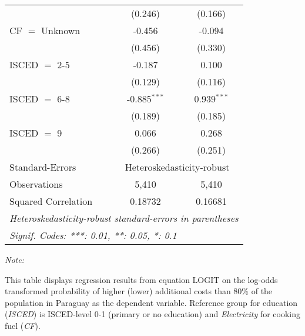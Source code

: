 \begin{table}[htbp!]
\begin{adjustbox}{width = 1\textwidth, max height = 0.95\textheight, center}
\begin{threeparttable}[b]
\begin{tabular}{lcc}
                                 & (0.246)        & (0.166)\\   
            CF $=$ Unknown       & -0.456         & -0.094\\   
                                 & (0.456)        & (0.330)\\   
            ISCED $=$ 2-5        & -0.187         & 0.100\\   
                                 & (0.129)        & (0.116)\\   
            ISCED $=$ 6-8        & -0.885$^{***}$ & 0.939$^{***}$\\   
                                 & (0.189)        & (0.185)\\   
            ISCED $=$ 9          & 0.066          & 0.268\\   
                                 & (0.266)        & (0.251)\\   
            \midrule 
            Standard-Errors & \multicolumn{2}{c}{Heteroskedasticity-robust} \\ 
            Observations         & 5,410          & 5,410\\  
            Squared Correlation  & 0.18732        & 0.16681\\  
            \midrule \midrule
            \multicolumn{3}{l}{\emph{Heteroskedasticity-robust standard-errors in parentheses}}\\
            \multicolumn{3}{l}{\emph{Signif. Codes: ***: 0.01, **: 0.05, *: 0.1}}\\
         \end{tabular}
         
         \begin{tablenotes}\item \medskip \textit{Note:}
            \item This table displays regression results from equation LOGIT on the log-odds transformed probability of higher (lower) additional costs than 80\% of the population in Paraguay as the dependent variable. Reference group for education (\textit{ISCED}) is ISCED-level 0-1 (primary or no education) and \textit{Electricity} for cooking fuel (\textit{CF}).
         \end{tablenotes}
      \end{threeparttable}
   \end{adjustbox}
\end{table}


